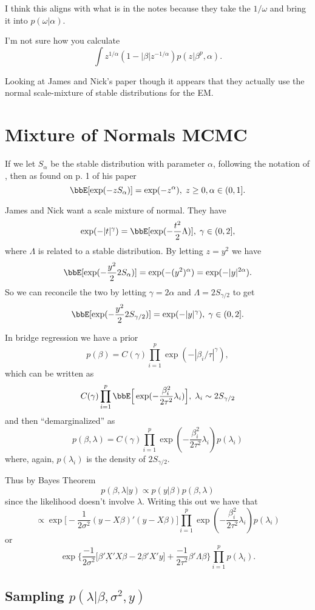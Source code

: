 \documentclass{article}
\begin{document}
I think this aligns with what is in the notes because they take the $1/\omega$
and bring it into $p(\omega | \alpha)$.

I'm not sure how you calculate
\[
\int z^{1/\alpha} (1 - |\beta| z^{-1/\alpha}) p(z | \beta^p, \alpha).
\]

Looking at James and Nick's paper though it appears that they actually use the
normal scale-mixture of stable distributions for the EM.

\section{Mixture of Normals MCMC}

If we let $S_\alpha$ be the stable distribution with parameter $\alpha$,
following the notation of \cite{devroye-2009}, then as found on p. 1 of his
paper
\[
\bbE[\exp(-z S_\alpha)] = \exp(-z^\alpha), \; z \geq 0, \alpha \in (0, 1].
\]

James and Nick want a scale mixture of normal.  They have
\[
\exp(-|t|^\gamma) = \bbE[ \exp(-\frac{t^2}{2} \Lambda) ], \; \gamma \in (0, 2],
\]
where $\Lambda$ is related to a stable distribution.  By letting $z = y^2$ we
have
\[
\bbE[\exp(-\frac{y^2}{2} 2 S_\alpha)] = \exp(-(y^2)^\alpha)
= \exp( - |y|^{2 \alpha} ).
\]
So we can reconcile the two by letting $\gamma = 2 \alpha$ and $\Lambda = 2
S_{\gamma / 2}$ to get
\[
\bbE[\exp(-\frac{y^2}{2} 2 S_{\gamma / 2})] = \exp( - |y|^{\gamma} ), \; \gamma
\in (0, 2].
\]

In bridge regression we have a prior
\[
p(\beta) = C(\gamma) \prod_{i=1}^p \exp (- |\beta_i / \tau|^\gamma ),
\]
which can be written as
\[
C(\gamma) \prod_{i=1}^p \bbE \Big[ \exp( - \frac{\beta_i^2}{2 \tau^2}
\lambda_i ) \Big], \; \lambda_i \sim 2 S_{\gamma / 2}
\]
and then ``demarginalized'' as
\[
p(\beta, \lambda) = C(\gamma) 
\prod_{i=1}^p \exp(- \frac{\beta_i^2}{2 \tau^2} \lambda_i) p(\lambda_i)
\]
where, again, $p(\lambda_i)$ is the density of $2 S_{\gamma/2}$.

Thus by Bayes Theorem
\[
p(\beta, \lambda | y) \propto p(y | \beta) p(\beta, \lambda)
\]
since the likelihood doesn't involve $\lambda$.  Writing this out we have that
\[
\propto
\exp \Big[ -\frac{1}{2 \sigma^2} (y - X \beta)'(y - X \beta) \Big]
\prod_{i=1}^p \exp(- \frac{\beta_i^2}{2 \tau^2} \lambda_i) p(\lambda_i)
\]
or
\[
\exp \Big\{ \frac{-1}{2 \sigma^2} \Big[ \beta' X'X \beta - 2 \beta' X' y \Big]
+ \frac{-1}{2 \tau^2} \beta' \Lambda \beta \Big\} \prod_{i=1}^p p(\lambda_i).
\]

\subsection{Sampling $p(\lambda | \beta, \sigma^2, y)$}
\end{document}
